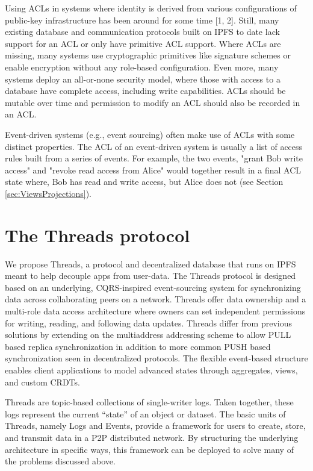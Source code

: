 \documentclass{comjnl}
\begin{document}
Using ACLs in systems where identity is derived from various configurations of public-key infrastructure has been around for some time [1, 2]. Still, many existing database and communication protocols built on IPFS to date lack support for an ACL or only have primitive ACL support. Where ACLs are missing, many systems use cryptographic primitives like signature schemes or enable encryption without any role-based configuration. Even more, many systems deploy an all-or-none security model, where those with access to a database have complete access, including write capabilities. ACLs should be mutable over time and permission to modify an ACL should also be recorded in an ACL.

Event-driven systems (e.g., event sourcing) often make use of ACLs with some distinct properties. The ACL of an event-driven system is usually a list of access rules built from a series of events. For example, the two events, "grant Bob write access" and "revoke read access from Alice" would together result in a final ACL state where, Bob has read and write access, but Alice does not (see Section  \ref{sec:ViewsProjections}).


\section{The Threads protocol}

We propose Threads, a protocol and decentralized database that runs on IPFS meant to help decouple apps from user-data. The Threads protocol is designed based on an underlying, CQRS-inspired event-sourcing system for synchronizing data across collaborating peers on a network. Threads offer data ownership and a multi-role data access architecture where owners can set independent permissions for writing, reading, and following data updates. Threads differ from previous solutions by extending on the multiaddress addressing scheme to allow PULL based replica synchronization in addition to more common PUSH based synchronization seen in decentralized protocols. The flexible event-based structure enables client applications to model advanced states through aggregates, views, and custom CRDTs.

Threads are topic-based collections of single-writer logs. Taken together, these logs represent the current “state” of an object or dataset. The basic units of Threads, namely Logs and Events, provide a framework for users to create, store, and transmit data in a P2P distributed network. By structuring the underlying architecture in specific ways, this framework can be deployed to solve many of the problems discussed above.
\end{document}
